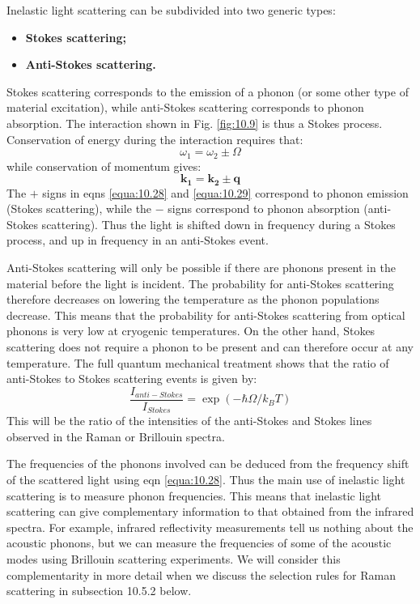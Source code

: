 \documentclass[12pt]{book}
\begin{document}
Inelastic light scattering can be subdivided into two generic types:
\begin{itemize}
  \item \textbf{Stokes scattering;}
  \item \textbf{Anti-Stokes scattering.}
\end{itemize}
Stokes scattering corresponds to the emission of a phonon (or some other type of material excitation), while anti-Stokes scattering corresponds to phonon absorption. The interaction shown in Fig. \ref{fig:10.9} is thus a Stokes process. Conservation of energy during the interaction requires that:
\begin{equation}\label{equa:10.28}
  \omega_1=\omega_2\pm\Omega
\end{equation}
while conservation of momentum gives:
\begin{equation}\label{equa:10.29}
  \mathbf{k_1}=\mathbf{k_2}\pm\mathbf{q}
\end{equation}
The $+$ signs in eqns \ref{equa:10.28} and \ref{equa:10.29} correspond to phonon emission (Stokes scattering), while the $-$ signs correspond to phonon absorption (anti-Stokes scattering). Thus the light is shifted down in frequency during a Stokes process, and up in frequency in an anti-Stokes event.

Anti-Stokes scattering will only be possible if there are phonons present in the material before the light is incident. The probability for anti-Stokes scattering therefore decreases on lowering the temperature as the phonon populations decrease. This means that the probability for anti-Stokes scattering from optical phonons is very low at cryogenic temperatures. On the other hand, Stokes scattering does not require a phonon to be present and can therefore occur at any temperature. The full quantum mechanical treatment shows that the ratio of anti-Stokes to Stokes scattering events is given by:
\begin{equation}\label{equa:10.30}
  \frac{I_{anti-Stokes}}{I_{Stokes}}=\exp(-\hbar\Omega/k_BT)
\end{equation}
This will be the ratio of the intensities of the anti-Stokes and Stokes lines observed in the Raman or Brillouin spectra.

The frequencies of the phonons involved can be deduced from the frequency shift of the scattered light using eqn \ref{equa:10.28}. Thus the main use of inelastic light scattering is to measure phonon frequencies. This means that inelastic light scattering can give complementary information to that obtained from the infrared spectra. For example, infrared reflectivity measurements tell us nothing about the acoustic phonons, but we can measure the frequencies of some of the acoustic modes using Brillouin scattering experiments. We will consider this complementarity in more detail when we discuss the selection rules for Raman scattering in subsection 10.5.2 below.
\end{document}
